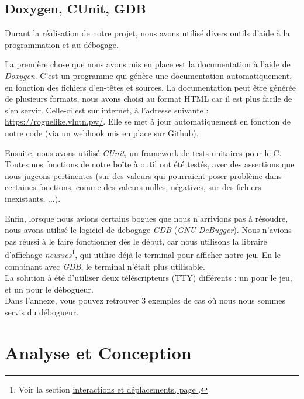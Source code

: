 \documentclass[11pt]{report}
\begin{document}
	\section{Doxygen, CUnit, GDB}\label{gdb}
	
		Durant la réalisation de notre projet, nous avons utilisé divers outils d'aide à la programmation et au débogage. 
		
		\vspace{12pt}		
		
		La première chose que nous avons mis en place est la documentation à l'aide de \emph{Doxygen}. C'est un programme qui génère une documentation automatiquement, en fonction des fichiers d'en-têtes et sources. La documentation peut être générée de plusieurs formats, nous avons choisi au format HTML car il est plus facile de s'en servir. Celle-ci est sur internet, à l'adresse suivante : \url{https://roguelike.vlntn.pw/}. Elle se met à jour automatiquement en fonction de notre code (via un webhook mis en place sur Github).
		
		\vspace{12pt}
		
		Ensuite, nous avons utilisé \emph{CUnit}, un framework de tests unitaires pour le C. Toutes nos fonctions de notre boîte à outil ont été testés, avec des assertions que nous jugeons pertinentes (sur des valeurs qui pourraient poser problème dans certaines fonctions, comme des valeurs nulles, négatives, sur des fichiers inexistants, ...).
		
		\vspace{12pt}
		
		Enfin, lorsque nous avions certains bogues que nous n'arrivions pas à résoudre, nous avons utilisé le logiciel de debogage \emph{GDB} (\emph{GNU DeBugger}). Nous n'avions pas réussi à le faire fonctionner dès le début, car nous utilisons la libraire d'affichage \emph{ncurses}\footnote{Voir la section \hyperref[ncurses]{interactions et déplacements, page }.}, qui utilise déjà le terminal pour afficher notre jeu. En le combinant avec \emph{GDB}, le terminal n'était plus utilisable.\\
		La solution à été d'utiliser deux téléscripteurs (\textsc{TTY}) différents : un pour le jeu, et un pour le débogueur.\\
		Dans l'annexe, vous pouvez retrouver 3 exemples de cas où nous nous sommes servis du débogueur.

\chapter{Analyse et Conception}
\end{document}
